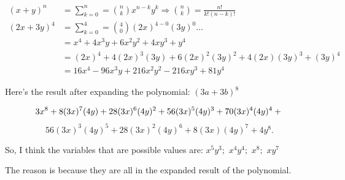 \begin{question}[Expand: $(2x - 3y)^{4}$]
  \begin{align}
    (x + y)^{n}   &= \sum_{k = 0}^{n} = {n \choose k}x^{n - k}y^{k} \Rightarrow {n \choose k} = \frac{n!}{k!(n - k)!} \\
    (2x + 3y)^{4} &= \sum_{k = 0}^{4} = {4 \choose 0}(2x)^{4 - 0}(3y)^{0} \ldots \\
                  &= x^{4} + 4x^3y + 6x^2y^2 + 4xy^3 + y^{4} \\
                  &= (2x)^{4} + 4(2x)^3(3y) + 6(2x)^2(3y)^2 + 4(2x)(3y)^3 + (3y)^{4} \\
                  &= \boxed{16x^{4} - 96x^{3}y + 216x^{2}y^{2} - 216xy^{3} + 81y^{4}}
  \end{align}
\end{question}

\begin{question}

  Here's the result after expanding the polynomial: $(3a + 3b)^{8}$

  \[
    3x^{8} + 8(3x)^{7}(4y) + 28(3x)^{6}(4y)^{2} + 56(3x)^{5}(4y)^{3} + 70(3x)^{4}(4y)^{4} + \\
  \]\[
    56(3x)^{3}(4y)^{5} + 28(3x)^{2}(4y)^{6} + 8(3x)(4y)^{7} + 4y^{8}
  .\]

  So, I think the variables that are possible values are: $x^{5}y^3;$ $x^{4}y^{4};$ $x^{8};$ $xy^{7}$

  The reason is because they are all in the expanded result of the polynomial.
\end{question}
